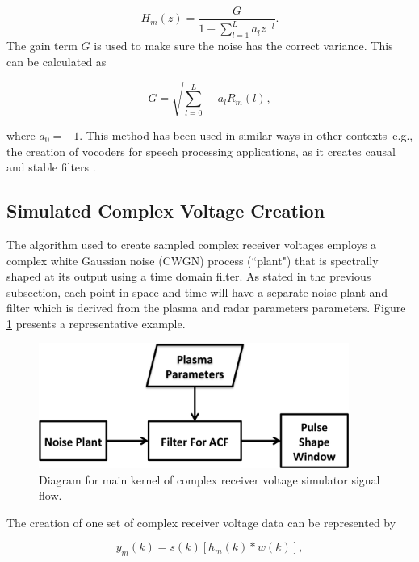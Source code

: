 \begin{equation}
\label{eq:filtz}
H_m(z) = \frac{G}{1-\displaystyle \sum_{l=1}^{L} a_l z^{-l}}.
\end{equation}
\noindent The gain term $G$ is used to make sure the noise has the correct variance. This can be calculated as 

\begin{equation}
\label{eq:gainterm}
G=\sqrt{\displaystyle \sum_{l=0}^L -a_l R_m(l)},
\end{equation}

\noindent where $a_0=-1$. This method has been used in similar ways in other contexts--e.g., the creation of vocoders for speech processing applications, as it creates causal and stable filters \cite{rabinerdigitalspeech}.

\subsection{Simulated Complex Voltage Creation}

The algorithm used to create sampled complex receiver voltages employs a complex white Gaussian noise (CWGN) process (``plant") that is spectrally shaped at its output using a time domain filter. As stated in the previous subsection, each point in space and time will have a separate noise plant and filter which is derived from the plasma and radar parameters parameters. Figure \ref{fig:IQdiagram} presents a representative example. 

\begin{figure}[h!]
\centering
\includegraphics[width=4in]{diagrampart}
\caption{Diagram for main kernel of complex receiver voltage simulator signal flow.}
\label{fig:IQdiagram}
\end{figure}

The creation of one set of complex receiver voltage data can be represented by

\begin{equation}
\label{eq2}
y_m (k)= s(k)\left[h_m(k)*w(k)\right],
\end{equation}
 
